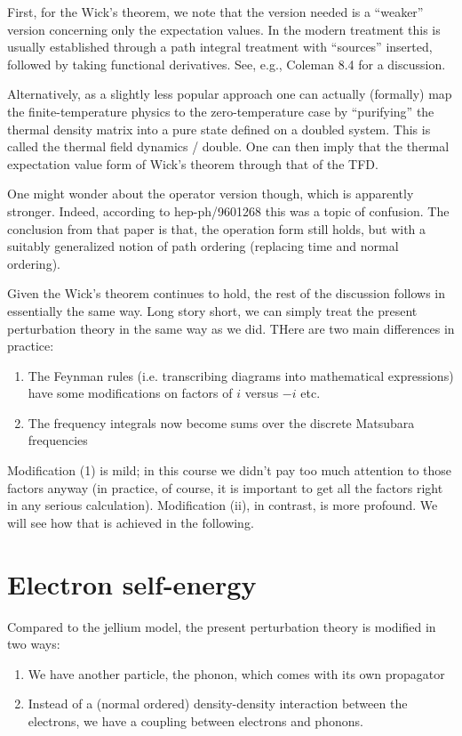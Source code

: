 First, for the Wick's theorem, we note that the version needed is a ``weaker'' version concerning only the expectation values. In the modern treatment this is usually established through a path integral treatment with ``sources'' inserted, followed by taking functional derivatives. See, e.g., Coleman 8.4 for a discussion.

Alternatively, as a slightly less popular approach one can actually (formally) map the finite-temperature physics to the zero-temperature case by ``purifying'' the thermal density matrix into a pure state defined on a doubled system. This is called the thermal field dynamics / double. One can then imply that the thermal expectation value form of Wick's theorem through that of the TFD.

One might wonder about the operator version though, which is apparently stronger. Indeed, according to hep-ph/9601268 this was a topic of confusion. The conclusion from that paper is that, the operation form still holds, but with a suitably generalized notion of path ordering (replacing time and normal ordering).

Given the Wick's theorem continues to hold, the rest of the discussion follows in essentially the same way. Long story short, we can simply treat the present perturbation theory in the same way as we did. THere are two main differences in practice:
\begin{enumerate}
    \item The Feynman rules (i.e. transcribing diagrams into mathematical expressions) have some modifications on factors of $i$ versus $-i$ etc.
    \item The frequency integrals now become sums over the discrete Matsubara frequencies
\end{enumerate}
Modification (1) is mild; in this course we didn't pay too much attention to those factors anyway (in practice, of course, it is important to get all the factors right in any serious calculation). Modification (ii), in contrast, is more profound. We will see how that is achieved in the following.

\section{Electron self-energy}

Compared to the jellium model, the present perturbation theory is modified in two ways:
\begin{enumerate}
    \item We have another particle, the phonon, which comes with its own propagator
    \item Instead of a (normal ordered) density-density interaction between the electrons, we have a coupling between electrons and phonons.
\end{enumerate}


